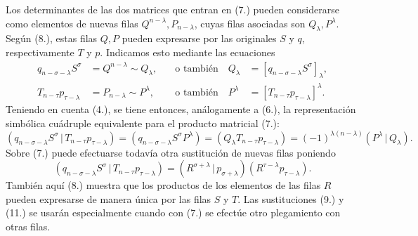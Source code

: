 \documentclass[11pt]{article}
\newcommand{\pair}[2]{(#1\,|\,#2)}
\begin{document}
Los determinantes de las dos matrices que entran en (7.) pueden considerarse como elementos de nuevas filas $Q^{n-\lambda},P_{n-\lambda}$, cuyas filas asociadas son $Q_\lambda,P^\lambda$. Según (8.), estas filas $Q,P$ pueden expresarse por las originales $S$ y $q$, respectivamente $T$ y $p$. Indicamos esto mediante las ecuaciones
\begin{equation}
\begin{aligned}
 q_{n-\sigma-\lambda}S^\sigma&=Q^{n-\lambda}\sim Q_\lambda, &\quad\text{o también}\quad Q_\lambda&=[q_{n-\sigma-\lambda}S^\sigma]_\lambda,\\
 T_{n-\tau}p_{\tau-\lambda}&=P_{n-\lambda}\sim P^\lambda, &\quad\text{o también}\quad P^\lambda&=[T_{n-\tau}p_{\tau-\lambda}]^\lambda.
\end{aligned}
\tag{9}
\end{equation}
Teniendo en cuenta (4.), se tiene entonces, análogamente a (6.), la representación simbólica cuádruple equivalente para el producto matricial (7.):
\begin{equation}
\pair{q_{n-\sigma-\lambda}S^\sigma}{T_{n-\tau}p_{\tau-\lambda}}
=(q_{n-\sigma-\lambda}S^\sigma P^\lambda)=(Q_\lambda T_{n-\tau}p_{\tau-\lambda})=(-1)^{\lambda(n-\lambda)}\pair{P^\lambda}{Q_\lambda}.
\tag{10}
\end{equation}
Sobre (7.) puede efectuarse todavía otra sustitución de nuevas filas poniendo
\begin{equation}
 \pair{q_{n-\sigma-\lambda}S^\sigma}{T_{n-\tau}p_{\tau-\lambda}}
 =\pair{R^{\sigma+\lambda}}{p_{\sigma+\lambda}}(R^{\tau-\lambda}p_{\tau-\lambda}).
\tag{11}
\end{equation}
También aquí (8.) muestra que los productos de los elementos de las filas $R$ pueden expresarse de manera única por las filas $S$ y $T$. Las sustituciones (9.) y (11.) se usarán especialmente cuando con (7.) se efectúe otro plegamiento con otras filas.
\end{document}
